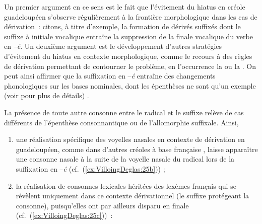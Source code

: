 \documentclass[output=paper]{langsci/langscibook}
\begin{document}
Un premier argument en ce sens est le fait que l'évitement du hiatus en
créole guadeloupéen s'observe régulièrement à la frontière morphologique
dans les cas de dérivation~: citons, à titre d'exemple, la formation de
dérivés suffixés dont le suffixe à initiale vocalique entraîne la
suppression de la finale vocalique du verbe en \emph{--é}. Un deuxième
argument est le développement d'autres stratégies d'évitement du hiatus
en contexte morphologique, comme le recours à des règles de dérivation
permettant de contourner le problème, en l'occurrence la  ou
la . On peut ainsi affirmer que la suffixation en --\emph{é}
entraîne des changements phonologiques sur les bases nominales, dont les
épenthèses ne sont qu'un exemple %
(voir %
\citealt{Villoing16} %
%
pour plus de détails)
%
.

La présence de toute autre consonne entre le radical et le suffixe
relève de cas différents de l'épenthèse consonnantique ou de
l'allomorphie suffixale. Ainsi,

\begin{enumerate}[label=(\roman*)]
\item une réalisation spécifique des voyelles nasales en contexte de
dérivation en guadeloupéen, comme dans d'autres créoles à base française
%
\citep[cf.][]{Bhatt00}%
%
, laisse apparaître une consonne nasale à la
suite de la voyelle nasale du radical lors de la suffixation en
--\emph{é} (cf.~(\ref{ex:VilloingDeglas:25b})) ;

\item la réalisation de consonnes lexicales héritées des lexèmes français
qui se révèlent uniquement dans ce contexte dérivationnel (le suffixe
protégeant la consonne), puisqu'elles ont par ailleurs disparu en finale
(cf.~(\ref{ex:VilloingDeglas:25c}))~:

\end{enumerate}
\end{document}
